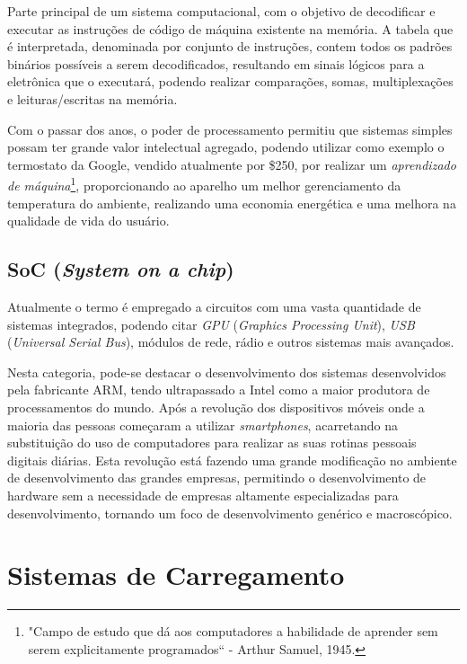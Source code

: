 Parte principal de um sistema computacional, com o objetivo de decodificar e executar as instruções de código de máquina existente na memória\cite{Patterson:2008:COD:1502247}. A tabela que é interpretada, denominada por conjunto de instruções, contem todos os padrões binários possíveis a serem decodificados, resultando em sinais lógicos para a eletrônica que o executará, podendo realizar comparações, somas, multiplexações e leituras/escritas na memória.

Com o passar dos anos, o poder de processamento permitiu que sistemas simples possam ter grande valor intelectual agregado, podendo utilizar como exemplo o termostato da Google, vendido atualmente por \$250, por realizar um \textit{aprendizado de máquina}\footnote{"Campo de estudo que dá aos computadores a habilidade de aprender sem serem explicitamente programados`` -  Arthur Samuel, 1945.}, proporcionando ao aparelho um melhor gerenciamento da temperatura do ambiente, realizando uma economia energética e uma melhora na qualidade de vida do usuário.

\subsection{SoC (\textit{System on a chip})}

Atualmente o termo é empregado a circuitos com uma vasta quantidade de sistemas integrados, podendo citar  \textit{GPU} (\textit{Graphics Processing Unit}), \textit{USB} (\textit{Universal Serial Bus}), módulos de rede, rádio e outros sistemas mais avançados.


Nesta categoria, pode-se destacar o desenvolvimento dos sistemas desenvolvidos pela fabricante ARM, tendo ultrapassado a Intel como a maior produtora de processamentos do mundo.
Após a revolução dos dispositivos móveis onde a maioria das pessoas começaram a utilizar \textit{smartphones}, acarretando na substituição do uso de computadores para realizar as suas rotinas pessoais digitais diárias. Esta revolução está fazendo uma grande modificação no ambiente de desenvolvimento das grandes empresas, permitindo o desenvolvimento de hardware sem a necessidade de empresas altamente especializadas para desenvolvimento, tornando um foco de desenvolvimento genérico e macroscópico.

\section{Sistemas de Carregamento}

